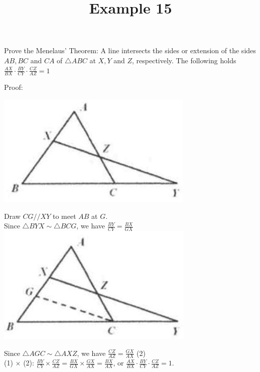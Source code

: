 \documentclass{article}
\title{Example 15}
\date{}
\begin{document}
\maketitle

Prove the Menelaus' Theorem: A line intersects the sides or extension of the sides \(A B, B C\) and \(C A\) of \(\triangle A B C\) at \(X, Y\) and \(Z\), respectively. The following holds \(\frac{A X}{B X} \cdot \frac{B Y}{C Y} \cdot \frac{C Z}{A Z}=1\)

Proof:
\begin{center}
\includegraphics[width=\textwidth]{images/problem_image_1.jpg}
\end{center}

Draw \(C G / / X Y\) to meet \(A B\) at \(G\).\\
Since \(\triangle B Y X \sim \triangle B C G\), we have \(\frac{B Y}{C Y}=\frac{B X}{G X}\)\\
\centering
\includegraphics[width=\textwidth]{images/reasoning_image_1.jpg}

Since \(\triangle A G C \sim \triangle A X Z\), we have \(\frac{C Z}{A Z}=\frac{G X}{A X}\) (2)\\
(1) \(\times\) (2): \(\frac{B Y}{C Y} \times \frac{C Z}{A Z}=\frac{B X}{G X} \times \frac{G X}{A X}=\frac{B X}{A X}\), or \(\frac{A X}{B X} \cdot \frac{B Y}{C Y} \cdot \frac{C Z}{A Z}=1\).
\end{document}
